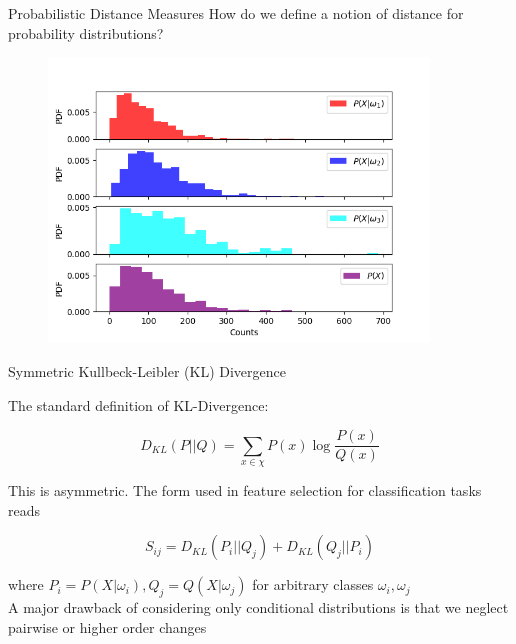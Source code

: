 \documentclass{beamer}					%
\begin{document}
\begin{frame}{Probabilistic Distance Measures}
\vspace{0.2in}
How do we define a notion of distance for probability distributions?
\begin{center}
\begin{figure}
\includegraphics[width=0.9\textwidth]{hists.png}
\end{figure}
\end{center}
\end{frame}

\begin{frame}{Symmetric Kullbeck-Leibler (KL) Divergence}

The standard definition of KL-Divergence:

\begin{equation*}
D_{KL}(P||Q) = \sum_{x\in\chi} P(x)\log\frac{P(x)}{Q(x)}
\end{equation*}

This is asymmetric. The form used in feature selection for classification tasks reads

\begin{equation*}
S_{ij} = D_{KL}(P_{i}||Q_{j}) + D_{KL}(Q_{j}||P_{i})
\end{equation*}

where $P_{i} = P(X|\omega_{i}), Q_{j} = Q(X|\omega_{j})$ for arbitrary classes $\omega_{i},\omega_{j}$\\
\vspace{0.1in}
A major drawback of considering only conditional distributions is that we neglect pairwise or higher order changes

\end{frame}
\end{document}
